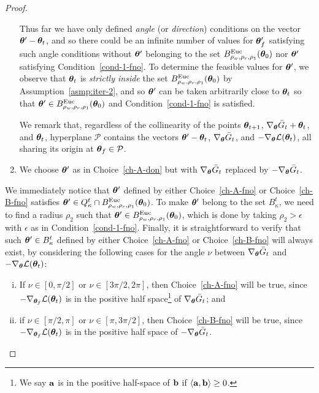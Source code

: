 \begin{proof}
\begin{enumerate}[{Choice} (A):]
Thus far we have only defined \emph{angle} (or \emph{direction}) conditions on the vector ${\bm{\theta}}'-{\bm{\theta}}_{t}$, and so there could be an infinite number of values for ${\bm{\theta}}'_f$ satisfying such angle conditions without ${\bm{\theta}}'$ belonging to the set $B^{\mathrm{Euc}}_{\rho_w,\rho_r,\rho_1}({\bm{\theta}}_0)$ nor ${\bm{\theta}}'$ satisfying Condition~\eqref{cond-1-fno}. To determine the feasible values for ${\bm{\theta}}'$, we observe that ${\bm{\theta}}_t$ is \emph{strictly inside} the set $B^{\mathrm{Euc}}_{\rho_w,\rho_r,\rho_1}({\bm{\theta}}_0)$ by Assumption~\ref{asmp:iter-2}, and so 
%
${\bm{\theta}}'$ can be taken arbitrarily close to ${\bm{\theta}}_{t}$ so that ${\bm{\theta}}'\in B^{\mathrm{Euc}}_{\rho_w,\rho_r,\rho_1}({\bm{\theta}}_0)$ and Condition~\eqref{cond-1-fno} is satisfied. 
%

We remark that, regardless of the collinearity of the points 
${\bm{\theta}}_{t+1}$, $\nabla_{\bm{\theta}}\bar{G}_t + {\bm{\theta}}_{t}$, and ${\bm{\theta}}_{t}$, hyperplane $\mathcal{P}$ contains the vectors ${\bm{\theta}}'-{\bm{\theta}}_{t}$, $\nabla_{\bm{\theta}}\bar{G}_t$, and $-\nabla_{{\bm{\theta}}}{\cal L}({\bm{\theta}}_t)$, all sharing its origin at ${\bm{\theta}}_{f}\in\mathcal{P}$. \label{ch-A-fno}
%
\item  
%
%
We choose ${\bm{\theta}}'$ as in Choice~\eqref{ch-A-don} but with $\nabla_{\bm{\theta}}\bar{G}_t$ replaced by $-\nabla_{\bm{\theta}}\bar{G}_t$.
%
\label{ch-B-fno}
%
%
\end{enumerate}
We immediately notice that ${\bm{\theta}}'$ defined by either Choice~\eqref{ch-A-fno} or Choice~\eqref{ch-B-fno} satisfies 
${\bm{\theta}}'\in Q^t_\kappa \cap B^{\mathrm{Euc}}_{\rho_w,\rho_r,\rho_1}({\bm{\theta}}_0)
$. To make ${\bm{\theta}}'$ belong to the set $B^t_\kappa$, we need to find a radius $\rho_2$ such that ${\bm{\theta}}'\in B^{\mathrm{Euc}}_{\rho_w,\rho_r,\rho_1}({\bm{\theta}}_0)$, which is done by taking $\rho_2>\epsilon$ with $\epsilon$ as in Condition~\eqref{cond-1-fno}. 
%
Finally, it is straightforward to verify that such ${\bm{\theta}}'\in B^t_\kappa$ defined by either Choice~\eqref{ch-A-fno} or Choice~\eqref{ch-B-fno} will always exist, by considering the following cases for the angle $\nu$ between $\nabla_{\bm{\theta}}\bar{G}_t$ and $-\nabla_{{\bm{\theta}}} {\cal L}({\bm{\theta}}_t)$:
\begin{enumerate}[(i)]
\item If $\nu \in [0, \pi/2]$ or $\nu \in [3\pi/2, 2\pi]$, then Choice~\eqref{ch-A-fno} will be true, since $-\nabla_{{\bm{\theta}}_f} {\cal L}({\bm{\theta}}_t)$ is in the positive half space\footnote{We say $\mathbf{a}$ is in the positive half-space of $\mathbf{b}$ if $\langle \mathbf{a}, \mathbf{b} \rangle \geq 0$.} of $\nabla_{\bm{\theta}}\bar{G}_t$; and
\label{it-i-fno}
\item if $\nu \in [\pi/2,\pi]$ or $\nu \in [\pi, 3\pi/2]$, then Choice~\eqref{ch-B-fno} will be true, since $-\nabla_{{\bm{\theta}}_f} {\cal L}({\bm{\theta}}_t)$ is in the positive half space of $-\nabla_{\bm{\theta}}\bar{G}_t$.\label{it-ii-fno}
\end{enumerate}


\end{proof}
